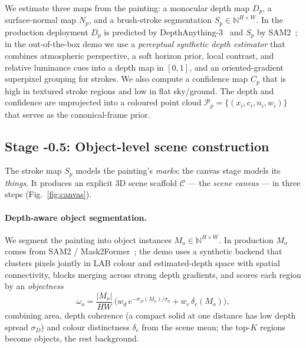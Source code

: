 We estimate three maps from the painting: a monocular depth map $D_p$, a
surface-normal map $N_p$, and a brush-stroke segmentation $S_p \in
\mathbb{N}^{H\times W}$. In the production deployment $D_p$ is predicted by
DepthAnything-3~\cite{da3} and $S_p$ by SAM2~\cite{sam2}; in the
out-of-the-box demo we use a \emph{perceptual synthetic depth estimator} that
combines atmospheric perspective, a soft horizon prior, local contrast, and
relative luminance cues into a depth map in $[0,1]$, and an oriented-gradient
superpixel grouping for strokes. We also compute a confidence map $C_p$ that
is high in textured stroke regions and low in flat sky/ground. The depth and
confidence are unprojected into a coloured point cloud
$\mathcal{P}_p = \{(x_i, c_i, n_i, w_i)\}$ that serves as the canonical-frame
prior.

\subsection{Stage -0.5: Object-level scene construction}
\label{sec:stage-object}

The stroke map $S_p$ models the painting's \emph{marks}; the canvas stage
models its \emph{things}. It produces an explicit 3D scene scaffold
$\mathcal{C}$ --- the \emph{scene canvas} --- in three steps
(Fig.~\ref{fig:canvas}).

\paragraph{Depth-aware object segmentation.}
We segment the painting into object instances $M_o \in
\mathbb{N}^{H\times W}$. In production $M_o$ comes from SAM2 /
Mask2Former~\cite{sam2,mask2former}; the demo uses a synthetic backend that
clusters pixels jointly in LAB colour and estimated-depth space with spatial
connectivity, blocks merging across strong depth gradients, and scores each
region by an \emph{objectness}
\begin{equation}
\omega_o = \frac{|M_o|}{HW}\,
\big(w_d\, e^{-\sigma_D(M_o)/\sigma_0} + w_c\, \delta_c(M_o)\big),
\end{equation}
combining area, depth coherence (a compact solid at one distance has low
depth spread $\sigma_D$) and colour distinctness $\delta_c$ from the scene
mean; the top-$K$ regions become objects, the rest background.

